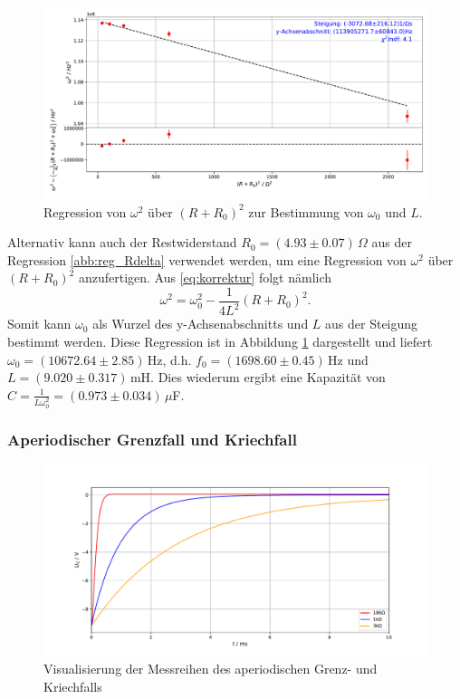 \documentclass[a4paper, 12pt]{scrartcl}
\begin{document}
\begin{figure}[h]
\centering
\includegraphics[width=\textwidth]{plots/reg_Rome.pdf}
\caption{Regression von $\omega^2$ über $(R+R_0)^2$ zur Bestimmung von $\omega_0$ und $L$.}
\label{abb:reg_Rome}
\end{figure}

Alternativ kann auch der Restwiderstand $R_0 = (4.93\pm 0.07)\,\Omega$ aus der Regression \ref{abb:reg_Rdelta} verwendet werden, um eine Regression von $\omega^2$ über $(R+R_0)^2$ anzufertigen. Aus \ref{eq:korrektur} folgt nämlich
$$\omega^2 = \omega_0^2 - \frac{1}{4L^2} (R+R_0)^2\text{.}$$
Somit kann $\omega_0$ als Wurzel des y-Achsenabschnitts und $L$ aus der Steigung bestimmt werden. Diese Regression ist in Abbildung \ref{abb:reg_Rome} dargestellt und liefert $\omega_0 = (10672.64\pm 2.85)\,$Hz, d.h. $f_0 = (1698.60\pm0.45)\,$Hz und $L = (9.020\pm0.317)\,$mH. Dies wiederum ergibt eine Kapazität von $C = \frac{1}{L\omega_0^2} = (0.973\pm 0.034)\,\mu$F.



\subsubsection{Aperiodischer Grenzfall und Kriechfall}

\begin{figure}[H]
\centering
\includegraphics[width=\textwidth]{plots/rohdaten_kriech.pdf}
\caption{Visualisierung der Messreihen des aperiodischen Grenz- und Kriechfalls}
\label{abb:rohkriech}
\end{figure}
\end{document}
